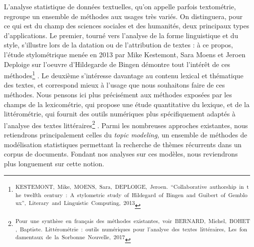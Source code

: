 \documentclass[letterpaper,portrait,12pt]{article}
\begin{document}
L'analyse statistique de donn\'{e}es textuelles, qu'on appelle parfois textom\'{e}trie, regroupe un ensemble de m\'{e}thodes aux usages tr\`{e}s vari\'{e}s. On distinguera, pour ce qui est du champ des sciences sociales et des humanit\'{e}s, deux principaux types d'applications. Le premier, tourn\'{e} vers l'analyse de la forme linguistique et du style, s'illustre lors de la datation ou de l'attribution de textes : \`{a} ce propos, l'\'{e}tude stylom\'{e}trique men\'{e}e en 2013 par Mike Kestemont, Sara Moens et Jeroen Deploige sur l'oeuvre d'Hildegarde de Bingen d\'{e}montre tout l'int\'{e}r\^{e}t de ces m\'{e}thodes\footnote{\textsuperscript{\newpage
}\textsuperscript{	KESTEMONT,\ Mike,\ MOENS,\ Sara,\ DEPLOIGE,\ Jeroen.\ {``}Collaborative\ authorship\ in\ the\ twelfth\ century\ :\ A\ stylometric\ study\ of\ Hildegard\ of\ Bingen\ and\ Guibert\ of\ Gembloux'',\ Literary\ and\ Linguistic\ Computing,\ 2013}} . Le deuxi\`{e}me s'int\'{e}resse davantage au contenu lexical et th\'{e}matique des textes, et correspond mieux \`{a} l'usage que nous souhaitons faire de ces m\'{e}thodes. Nous pensons ici plus pr\'{e}cis\'{e}ment aux m\'{e}thodes expos\'{e}es par les champs de la lexicom\'{e}trie, qui propose une \'{e}tude quantitative du lexique, et de la litt\'{e}rom\'{e}trie, qui fournit des outils num\'{e}riques plus sp\'{e}cifiquement adapt\'{e}s \`{a} l'analyse des textes litt\'{e}raires\footnote{\textsuperscript{\newpage
}\textsuperscript{	Pour\ une\ synth\`{e}se\ en\ fran\c{c}ais\ des\ m\'{e}thodes\ existantes,\ voir\ BERNARD,\ Michel,\ BOHET,\ Baptiste.\ Litt\'{e}rom\'{e}trie\ :\ outils\ num\'{e}riques\ pour\ l'analyse\ des\ textes\ litt\'{e}raires,\ Les\ fondamentaux\ de\ la\ Sorbonne\ Nouvelle,\ 2017}} . Parmi les nombreuses approches existantes, nous retiendrons principalement celles du \emph{topic modeling,} un ensemble de m\'{e}thodes de mod\'{e}lisation statistiques permettant la recherche de th\`{e}mes r\'{e}currents dans un corpus de documents. Fondant nos analyses sur ces mod\`{e}les, nous reviendrons plus longuement sur cette notion. 
\end{document}
